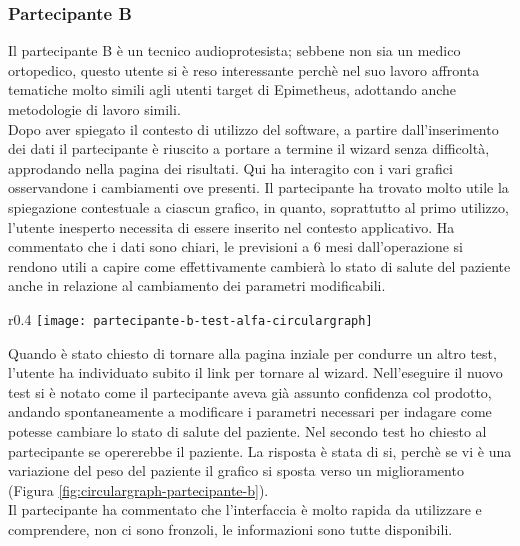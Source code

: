 \subsubsection{Partecipante B}
\label{partecipante-b}
Il partecipante B è un tecnico audioprotesista; sebbene non sia un medico ortopedico, questo utente si è reso interessante perchè nel suo lavoro affronta tematiche molto simili agli utenti target di Epimetheus, adottando anche metodologie di lavoro simili.\\
Dopo aver spiegato il contesto di utilizzo del software, a partire dall'inserimento dei dati il partecipante è riuscito a portare a termine il wizard senza difficoltà, approdando nella pagina dei risultati. Qui ha interagito con i vari grafici osservandone i cambiamenti ove presenti. Il partecipante ha trovato molto utile la spiegazione contestuale a ciascun grafico, in quanto, soprattutto al primo utilizzo, l'utente inesperto necessita di essere inserito nel contesto applicativo. Ha commentato che i dati sono chiari, le previsioni a 6 mesi dall'operazione si rendono utili a capire come effettivamente cambierà lo stato di salute del paziente anche in relazione al cambiamento dei parametri modificabili. \\

\begin{wrapfigure}{r}{0.4\textwidth}
    \centering
    \texttt{[image: partecipante-b-test-alfa-circulargraph]}
    \caption{Circulargraph del test Alfa condotto dal partecipante B}
    \caption*{In questo test si è indagato l'ambito dell'operazione all'anca}
    \label{fig:circulargraph-partecipante-b}
\end{wrapfigure}

Quando è stato chiesto di tornare alla pagina inziale per condurre un altro test, l'utente ha individuato subito il link per tornare al wizard. Nell'eseguire il nuovo test si è notato come il partecipante aveva già assunto confidenza col prodotto, andando spontaneamente a modificare i parametri necessari per indagare come potesse cambiare lo stato di salute del paziente. Nel secondo test ho chiesto al partecipante se opererebbe il paziente. La risposta è stata di si, perchè se vi è una variazione del peso del paziente il grafico si sposta verso un miglioramento (Figura \ref{fig:circulargraph-partecipante-b}). \\
Il partecipante ha commentato che l'interfaccia è molto rapida da utilizzare e comprendere, non ci sono fronzoli, le informazioni sono tutte disponibili. \\

